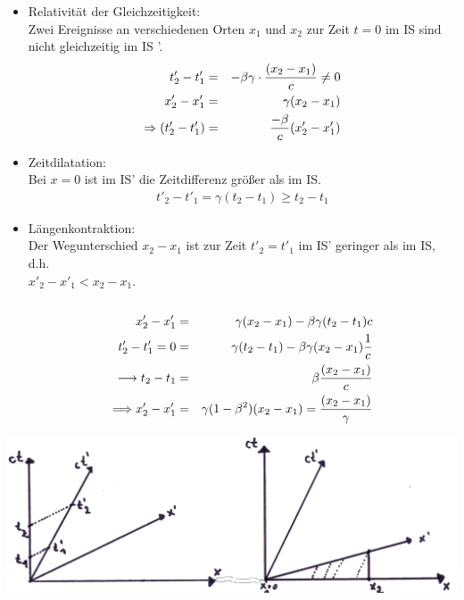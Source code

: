 \begin{itemize}


\item {Relativität der Gleichzeitigkeit:}\\
Zwei Ereignisse an verschiedenen Orten $x_1$ und $x_2$ zur Zeit $t=0$ im IS  sind nicht gleichzeitig im IS '.
\begin{eqnarray*}
t'_2-t'_1 &=& -\beta \gamma \cdot \frac{(x_2-x_1)} c \neq 0\\
x'_2-x'_1 &=& \gamma(x_2-x_1)\\
\Rightarrow (t'_2-t'_1) &=& \frac {-\beta}c (x'_2-x'_1)
\end{eqnarray*}

\item {Zeitdilatation:}\\
Bei $x=0$ ist im IS' die Zeitdifferenz größer als im IS.
\begin{eqnarray*}
t'_2-t'_1 = \gamma(t_2-t_1) \ge t_2-t_1
\end{eqnarray*}

\item{Längenkontraktion:}\\
Der Wegunterschied $x_2-x_1$ ist zur Zeit $t'_2 = t'_1$  im IS'  geringer als im IS, d.h.\\ $x'_2-x'_1< x_2-x_1$.\\
\\




\begin{eqnarray*}
x'_2-x'_1 &=& \gamma (x_2-x_1) - \beta\gamma(t_2-t_1) c\\
t'_2 - t'_1 = 0 &=& \gamma (t_2-t_1) - \beta \gamma (x_2-x_1)\frac 1 c\\
\longrightarrow t_2-t_1 &=& \beta \frac{(x_2-x_1) } c\\
\Longrightarrow x'_2 -x'_1 &=& \gamma(1-\beta^ 2)(x_2-x_1) = \frac{(x_2-x_1)} {\gamma}
\end{eqnarray*}


\end{itemize}
\begin{center}
	\includegraphics[scale=0.20]{Figs/Pim000111.png}
\end{center}

